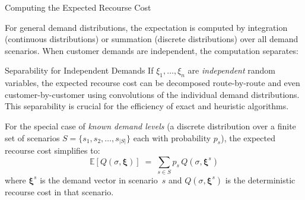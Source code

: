 \documentclass[aspectratio=169,10pt]{beamer}
\begin{document}
\begin{frame}[allowframebreaks]{Computing the Expected Recourse Cost}
  \framebreak

  For general demand distributions, the expectation is computed by
  integration (continuous distributions) or summation (discrete distributions)
  over all demand scenarios.
  When customer demands are independent, the computation separates:

  \begin{block}{Separability for Independent Demands}
    If $\xi_1, \ldots, \xi_n$ are \emph{independent} random variables,
    the expected recourse cost can be decomposed route-by-route and
    even customer-by-customer using convolutions of the individual
    demand distributions.
    This separability is crucial for the efficiency of exact and
    heuristic algorithms.
  \end{block}

  For the special case of \emph{known demand levels} (a discrete
  distribution over a finite set of scenarios
  $S = \{s_1, s_2, \ldots, s_{|S|}\}$ each with probability $p_s$), the
  expected recourse cost simplifies to:
  \[
    \mathbb{E}[Q(\sigma,\boldsymbol{\xi})]
    \;=\; \sum_{s \in S} p_s \, Q(\sigma, \boldsymbol{\xi}^s)
  \]
  where $\boldsymbol{\xi}^s$ is the demand vector in scenario~$s$ and
  $Q(\sigma, \boldsymbol{\xi}^s)$ is the deterministic recourse cost in that
  scenario.

\end{frame}
\end{document}
